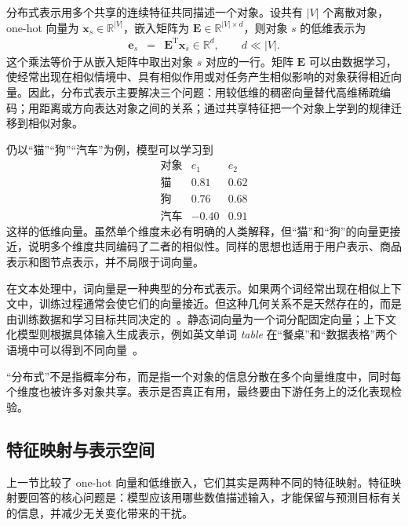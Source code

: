 分布式表示用多个共享的连续特征共同描述一个对象。设共有 $|V|$ 个离散对象，one-hot 向量为 $\mathbf{x}_s\in\mathbb{R}^{|V|}$，嵌入矩阵为 $\mathbf{E}\in\mathbb{R}^{|V|\times d}$，则对象 $s$ 的低维表示为
\begin{eqnarray}
\mathbf{e}_s &=& \mathbf{E}^{\mathrm{T}}\mathbf{x}_s
\in\mathbb{R}^{d},
\qquad d\ll |V|.
\end{eqnarray}
这个乘法等价于从嵌入矩阵中取出对象 $s$ 对应的一行。矩阵 $\mathbf{E}$ 可以由数据学习，使经常出现在相似情境中、具有相似作用或对任务产生相似影响的对象获得相近向量。因此，分布式表示主要解决三个问题：用较低维的稠密向量替代高维稀疏编码；用距离或方向表达对象之间的关系；通过共享特征把一个对象上学到的规律迁移到相似对象。

仍以“猫”“狗”“汽车”为例，模型可以学习到
\[
\begin{array}{c|cc}
\text{对象} & e_1 & e_2\\ \hline
\text{猫} & 0.81 & 0.62\\
\text{狗} & 0.76 & 0.68\\
\text{汽车} & -0.40 & 0.91
\end{array}
\]
这样的低维向量。虽然单个维度未必有明确的人类解释，但“猫”和“狗”的向量更接近，说明多个维度共同编码了二者的相似性。同样的思想也适用于用户表示、商品表示和图节点表示，并不局限于词向量。

在文本处理中，词向量是一种典型的分布式表示。如果两个词经常出现在相似上下文中，训练过程通常会使它们的向量接近。但这种几何关系不是天然存在的，而是由训练数据和学习目标共同决定的~\cite{harris:1954distributional,firth:1957synopsis,MikolovEtAl2013Word2Vec,PenningtonEtAl2014GloVe}。静态词向量为一个词分配固定向量；上下文化模型则根据具体输入生成表示，例如英文单词 \textit{table} 在“餐桌”和“数据表格”两个语境中可以得到不同向量~\cite{Kelly-Stone:1975senses}。

\begin{importantnote}
  “分布式”不是指概率分布，而是指一个对象的信息分散在多个向量维度中，同时每个维度也被许多对象共享。表示是否真正有用，最终要由下游任务上的泛化表现检验。
\end{importantnote}

\subsection{特征映射与表示空间}

上一节比较了 one-hot 向量和低维嵌入，它们其实是两种不同的特征映射。特征映射要回答的核心问题是：模型应该用哪些数值描述输入，才能保留与预测目标有关的信息，并减少无关变化带来的干扰。

